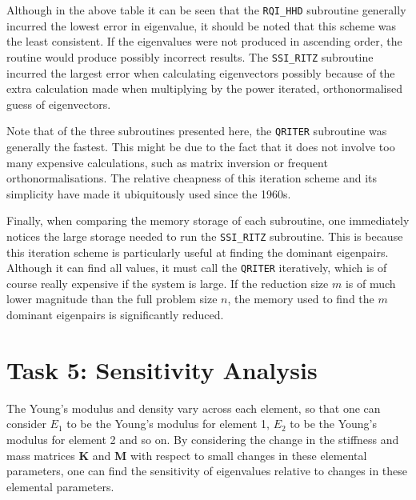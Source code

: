 \documentclass[11pt,oneside]{article}
\begin{document}
Although in the above table it can be seen that the \texttt{RQI\_HHD} subroutine generally incurred the lowest error in eigenvalue, it should be noted that this scheme was the least consistent. If the eigenvalues were not produced in ascending order, the routine would produce possibly incorrect results. The \texttt{SSI\_RITZ} subroutine incurred the largest error when calculating eigenvectors possibly because of the extra calculation made when multiplying by the power iterated, orthonormalised guess of eigenvectors.

Note that of the three subroutines presented here, the \texttt{QRITER} subroutine was generally the fastest. This might be due to the fact that it does not involve too many expensive calculations, such as matrix inversion or frequent orthonormalisations. The relative cheapness of this iteration scheme and its simplicity have made it ubiquitously used since the 1960s.

Finally, when comparing the memory storage of each subroutine, one immediately notices the large storage needed to run the \texttt{SSI\_RITZ} subroutine. This is because this iteration scheme is particularly useful at finding the dominant eigenpairs. Although it can find all values, it must call the \texttt{QRITER} iteratively, which is of course really expensive if the system is large. If the reduction size $m$ is of much lower magnitude than the full problem size $n$, the memory used to find the $m$ dominant eigenpairs is significantly reduced.

\section*{Task 5: Sensitivity Analysis}

The Young's modulus and density vary across each element, so that one can consider $E_1$ to be the Young's modulus for element 1, $E_2$ to be the Young's modulus for element 2 and so on. By considering the change in the stiffness and mass matrices \textbf{K} and \textbf{M} with respect to small changes in these elemental parameters, one can find the sensitivity of eigenvalues relative to changes in these elemental parameters. 
\end{document}
